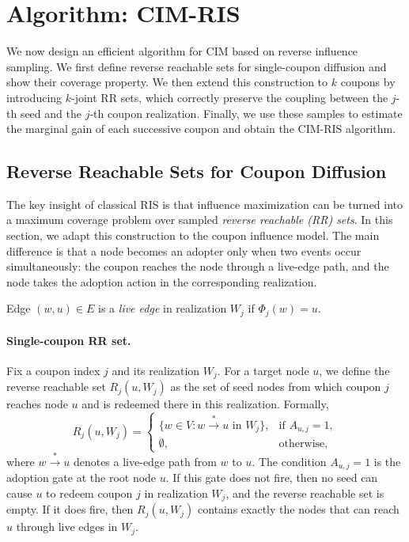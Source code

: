 \documentclass[sigconf,balance=false]{acmart}
\newcommand{\CIMRIS}{\textsc{CIM-RIS}}
\begin{document}
\section{Algorithm: \CIMRIS{}}
\label{sec:algo}

We now design an efficient algorithm for CIM based on reverse
influence sampling.
We first define reverse reachable sets for single-coupon diffusion and
show their coverage property.
We then extend this construction to $k$ coupons by introducing
$k$-joint RR sets, which correctly preserve the coupling between the
$j$-th seed and the $j$-th coupon realization.
Finally, we use these samples to estimate the marginal gain of each
successive coupon and obtain the \CIMRIS{} algorithm.

\subsection{Reverse Reachable Sets for Coupon Diffusion}

The key insight of classical RIS is that influence maximization can be
turned into a maximum coverage problem over sampled \emph{reverse
reachable (RR) sets}.
In this section, we adapt this construction to the coupon influence
model.
The main difference is that a node becomes an adopter only when two events
occur simultaneously: the coupon reaches the node through a live-edge path,
and the node takes the adoption action in the corresponding realization.

\begin{definition}
Edge $(w,u) \in E$ is a \emph{live edge} in realization $W_j$ if\/
$\Phi_j(w)=u$.
\end{definition}

\paragraph{Single-coupon RR set.}
Fix a coupon index $j$ and its realization $W_j$.
For a target node $u$, we define the reverse reachable set
$R_j(u,W_j)$ as the set of seed nodes from which coupon $j$ reaches node $u$
and is redeemed there in this realization.
Formally,
\[
  R_j(u, W_j) =
  \begin{cases}
    \{w \in V : w \xrightarrow{*} u \text{ in } W_j\},
      & \text{if } A_{u,j} = 1, \\
    \emptyset, & \text{otherwise,}
  \end{cases}
\]
where $w\xrightarrow{*}u$ denotes a live-edge path from $w$ to $u$.
The condition $A_{u,j}=1$ is the adoption gate at the root node $u$.
If this gate does not fire, then no seed can cause $u$ to redeem coupon $j$
in realization $W_j$, and the reverse reachable set is empty.
If it does fire, then $R_j(u,W_j)$ contains exactly the nodes that can
reach $u$ through live edges in $W_j$.
\end{document}
